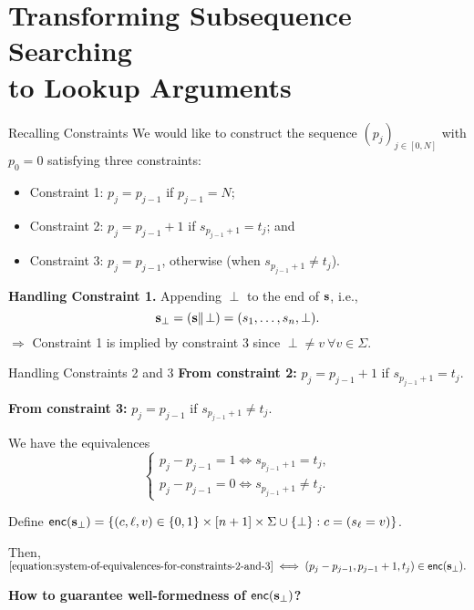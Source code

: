\section{Transforming Subsequence Searching\\ to Lookup Arguments}
\begin{frame}{Recalling Constraints}
	We would like to construct the sequence $(p_j)_{j \in [0, N]}$ with $p_0 = 0$ satisfying three constraints:
	\begin{itemize}
		\item Constraint 1: $p_j = p_{j - 1}$ if $p_{j - 1} = N$;\\
		\item Constraint 2: $p_j = p_{j - 1} + 1$ if $s_{p_{j - 1} + 1} = t_j$; and\\
		\item Constraint 3: $p_j = p_{j - 1}$, otherwise (when $s_{p_{j - 1} + 1} \not= t_j$).
	\end{itemize}
	
	\textbf{Handling Constraint 1.} Appending $\perp$ to the end of $\mathbf{s}$, i.e.,
	\begin{equation*}
		\mathbf{s}_\perp = (\mathbf{s}\Vert\!\perp) = (s_1, \dots, s_n, \perp).
	\end{equation*}
	$\Rightarrow$ Constraint 1 is implied by constraint 3 since $\perp \not= v~\forall v \in \Sigma$.
\end{frame}
\begin{frame}{Handling Constraints 2 and 3}
	\textbf{From constraint 2:} $p_j = p_{j - 1} + 1$ if $s_{p_{j - 1} + 1} = t_j$.
	
	\textbf{From constraint 3:} $p_j = p_{j - 1}$ if $s_{p_{j - 1} + 1} \not= t_j$.
	
	We have the equivalences
	\begin{equation}\label{equation:system-of-equivalences-for-constraints-2-and-3}
		\begin{cases}
			p_j - p_{j - 1} = 1 \iff s_{p_{j - 1} + 1} = t_j,\\ 
			p_j - p_{j - 1} = 0 \iff s_{p_{j - 1} + 1} \not= t_j.
		\end{cases}
	\end{equation}
	
	Define $\mathsf{enc}(\mathbf{s}_\perp)  = \{(c, \ell, v) \in \{0,1\}\times[n+1]\times\Sigma\cup\{\perp\} : c = (s_\ell = v)\}$.
	
	Then,
	$
		\eqref{equation:system-of-equivalences-for-constraints-2-and-3} \iff (p_j - p_{j - 1}, p_{j - 1} + 1, t_j) \in \mathsf{enc}(\mathbf{s}_\perp).
	$
	
	\pause
	\begin{center}
		\textbf{How to guarantee well-formedness of $\mathsf{enc}(\mathbf{s}_\perp)$?}
	\end{center}
\end{frame}

